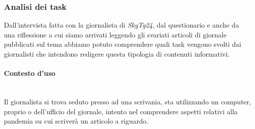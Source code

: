 \subsubsection{Analisi dei task}
Dall'intervista fatta con la giornalista di \textit{SkyTg24}, dal questionario e anche da una riflessione a cui siamo arrivati leggendo gli svariati articoli di giornale pubblicati sul tema abbiamo potuto comprendere quali task vengono svolti dai giornalisti che intendono redigere questa tipologia di contenuti informativi.

\paragraph{Contesto d'uso}\mbox{}\\
Il giornalista si trova seduto presso ad una scrivania, sta utilizzando un computer, proprio o dell'ufficio del giornale, intento nel comprendere aspetti relativi alla pandemia su cui scriverà un articolo a riguardo.

